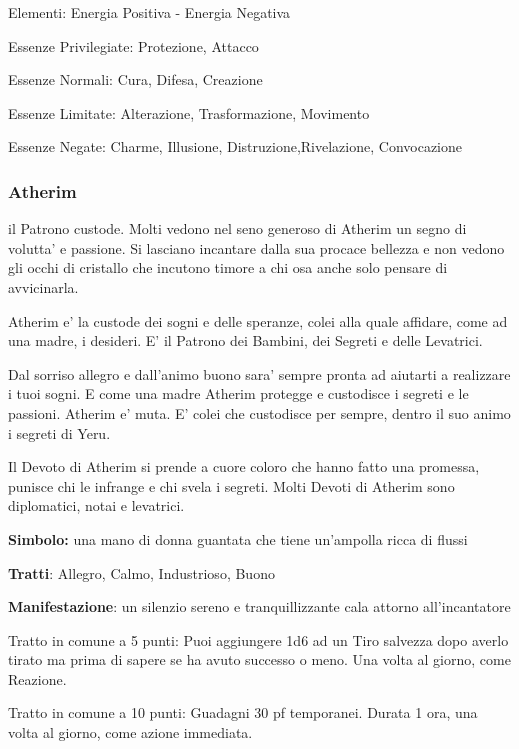 \documentclass[a4paper,11pt,twoside,openany]{book}
\begin{document}
{		\bigskip
		
		Elementi: Energia Positiva - Energia Negativa
		
		\bigskip
		
		Essenze Privilegiate: Protezione, Attacco
		
		Essenze Normali: Cura, Difesa, Creazione
		
		Essenze Limitate: Alterazione, Trasformazione, Movimento
		
		Essenze Negate: Charme, Illusione, Distruzione,Rivelazione, Convocazione
		
		\subsubsection{Atherim}
		
		\label{atherim}
		
		il Patrono custode. Molti vedono nel seno generoso di Atherim un segno di volutta' e passione. Si lasciano incantare dalla sua procace bellezza e non vedono gli occhi di cristallo che incutono timore a chi osa anche solo pensare di avvicinarla.
		
		Atherim e' la custode dei sogni e delle speranze, colei alla quale affidare, come ad una madre, i desideri. E' il Patrono dei Bambini, dei Segreti e delle Levatrici.
		
		Dal sorriso allegro e dall'animo buono sara' sempre pronta ad aiutarti a realizzare i tuoi sogni. E come una madre Atherim protegge e custodisce i segreti e le passioni. Atherim e' muta. E' colei che custodisce per sempre, dentro il suo animo i segreti di Yeru.
		
		Il Devoto di Atherim si prende a cuore coloro che hanno fatto una promessa, punisce chi le infrange e chi svela i segreti. Molti Devoti di Atherim sono diplomatici, notai e levatrici.
		
		\textbf{Simbolo:} una mano di donna guantata che tiene un'ampolla ricca di flussi
		
		\textbf{Tratti}: Allegro, Calmo, Industrioso, Buono
		
		\textbf{Manifestazione}: un silenzio sereno e tranquillizzante cala attorno all'incantatore
		
		\bigskip
		
		Tratto in comune a 5 punti: Puoi aggiungere 1d6 ad un Tiro salvezza dopo averlo tirato ma prima di sapere se ha avuto successo o meno. Una volta al giorno, come Reazione.
		
		Tratto in comune a 10 punti: Guadagni 30 pf temporanei. Durata 1 ora, una volta al giorno, come azione immediata.
		
}
\end{document}
